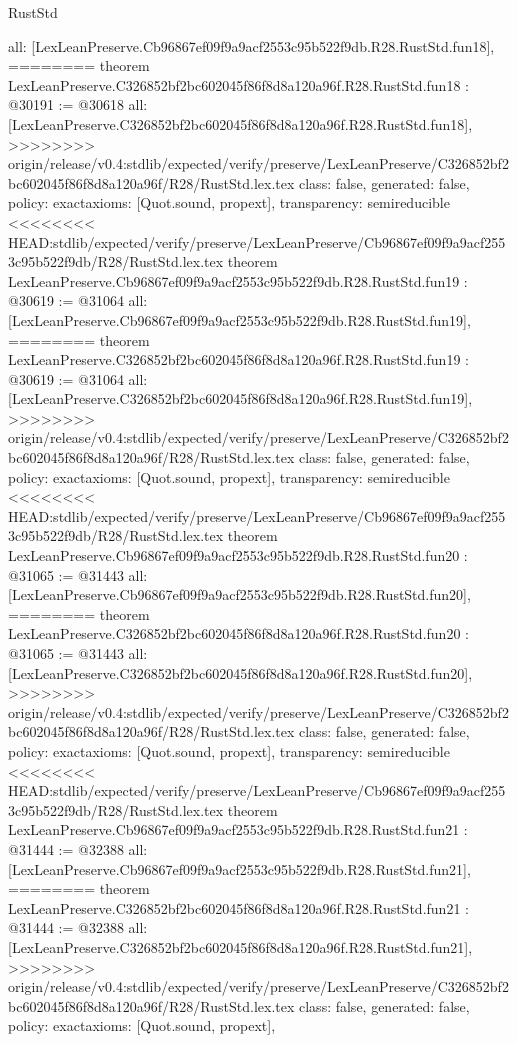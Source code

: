 \begin{lexlean}{RustStd}
\begin{coremodule}
{\begin{coremodule}
{{{{{{{{{{{{{{{{{{{{{  all: [LexLeanPreserve.Cb96867ef09f9a9acf2553c95b522f9db.R28.RustStd.fun18],
========
theorem LexLeanPreserve.C326852bf2bc602045f86f8d8a120a96f.R28.RustStd.fun18 : @30191 := @30618 {
  all: [LexLeanPreserve.C326852bf2bc602045f86f8d8a120a96f.R28.RustStd.fun18],
>>>>>>>> origin/release/v0.4:stdlib/expected/verify/preserve/LexLeanPreserve/C326852bf2bc602045f86f8d8a120a96f/R28/RustStd.lex.tex
  class: false,
  generated: false,
  policy: exact{axioms: [Quot.sound, propext]},
  transparency: semireducible
}
<<<<<<<< HEAD:stdlib/expected/verify/preserve/LexLeanPreserve/Cb96867ef09f9a9acf2553c95b522f9db/R28/RustStd.lex.tex
theorem LexLeanPreserve.Cb96867ef09f9a9acf2553c95b522f9db.R28.RustStd.fun19 : @30619 := @31064 {
  all: [LexLeanPreserve.Cb96867ef09f9a9acf2553c95b522f9db.R28.RustStd.fun19],
========
theorem LexLeanPreserve.C326852bf2bc602045f86f8d8a120a96f.R28.RustStd.fun19 : @30619 := @31064 {
  all: [LexLeanPreserve.C326852bf2bc602045f86f8d8a120a96f.R28.RustStd.fun19],
>>>>>>>> origin/release/v0.4:stdlib/expected/verify/preserve/LexLeanPreserve/C326852bf2bc602045f86f8d8a120a96f/R28/RustStd.lex.tex
  class: false,
  generated: false,
  policy: exact{axioms: [Quot.sound, propext]},
  transparency: semireducible
}
<<<<<<<< HEAD:stdlib/expected/verify/preserve/LexLeanPreserve/Cb96867ef09f9a9acf2553c95b522f9db/R28/RustStd.lex.tex
theorem LexLeanPreserve.Cb96867ef09f9a9acf2553c95b522f9db.R28.RustStd.fun20 : @31065 := @31443 {
  all: [LexLeanPreserve.Cb96867ef09f9a9acf2553c95b522f9db.R28.RustStd.fun20],
========
theorem LexLeanPreserve.C326852bf2bc602045f86f8d8a120a96f.R28.RustStd.fun20 : @31065 := @31443 {
  all: [LexLeanPreserve.C326852bf2bc602045f86f8d8a120a96f.R28.RustStd.fun20],
>>>>>>>> origin/release/v0.4:stdlib/expected/verify/preserve/LexLeanPreserve/C326852bf2bc602045f86f8d8a120a96f/R28/RustStd.lex.tex
  class: false,
  generated: false,
  policy: exact{axioms: [Quot.sound, propext]},
  transparency: semireducible
}
<<<<<<<< HEAD:stdlib/expected/verify/preserve/LexLeanPreserve/Cb96867ef09f9a9acf2553c95b522f9db/R28/RustStd.lex.tex
theorem LexLeanPreserve.Cb96867ef09f9a9acf2553c95b522f9db.R28.RustStd.fun21 : @31444 := @32388 {
  all: [LexLeanPreserve.Cb96867ef09f9a9acf2553c95b522f9db.R28.RustStd.fun21],
========
theorem LexLeanPreserve.C326852bf2bc602045f86f8d8a120a96f.R28.RustStd.fun21 : @31444 := @32388 {
  all: [LexLeanPreserve.C326852bf2bc602045f86f8d8a120a96f.R28.RustStd.fun21],
>>>>>>>> origin/release/v0.4:stdlib/expected/verify/preserve/LexLeanPreserve/C326852bf2bc602045f86f8d8a120a96f/R28/RustStd.lex.tex
  class: false,
  generated: false,
  policy: exact{axioms: [Quot.sound, propext]},
}}}}}}}}}}}}}}}}}}}}}}}}}
\end{coremodule}}
\end{coremodule}
\end{lexlean}

